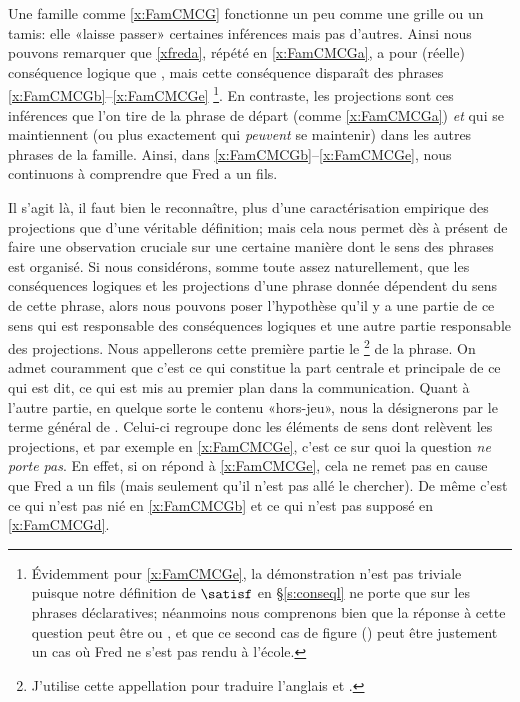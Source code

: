 \begin{refsegment}
Une famille comme \ref{x:FamCMCG} fonctionne un peu comme une grille ou un tamis: elle «laisse passer» certaines inférences mais pas d'autres.
Ainsi nous pouvons remarquer que \ref{xfreda}, répété en \ref{x:FamCMCGa}, a pour (réelle) conséquence logique que , mais cette conséquence disparaît des phrases \ref{x:FamCMCGb}--\ref{x:FamCMCGe}%
\footnote{Évidemment pour \ref{x:FamCMCGe}, la démonstration n'est pas triviale puisque notre définition de $\satisf$ en \S\ref{s:conseql} ne porte que sur les phrases déclaratives; néanmoins nous comprenons bien que la réponse à cette question peut être  ou , et que  ce second cas de figure () peut être justement un cas où Fred ne s'est pas rendu à l'école.}.
En contraste, les projections sont ces inférences que l'on  tire de la phrase de départ (comme  \ref{x:FamCMCGa}) \emph{et} qui se maintiennent (ou plus exactement qui \emph{peuvent} se maintenir)  dans les autres phrases de la famille.
Ainsi, dans \ref{x:FamCMCGb}--\ref{x:FamCMCGe}, nous continuons à comprendre que Fred a un fils.


Il s'agit là, il faut bien le reconnaître,  plus d'une caractérisation empirique des projections que d'une véritable définition; mais cela nous permet dès à présent de faire une observation cruciale sur une certaine manière dont le sens des phrases est organisé.  
Si nous considérons, somme toute assez naturellement, que les conséquences logiques et les projections d'une phrase donnée dépendent du sens de cette phrase, alors nous pouvons poser l'hypothèse qu'il y a une partie de ce sens qui est responsable des conséquences logiques et une autre partie responsable des projections.  
Nous appellerons cette première partie le \footnote{J'utilise cette appellation pour traduire l'anglais  et .} de la phrase.  On admet couramment que c'est ce qui constitue la part centrale et principale de ce qui est dit, ce qui est mis au premier plan dans la communication.  Quant à l'autre partie, en quelque sorte le contenu «hors-jeu», nous la désignerons par le terme général de .  
Celui-ci regroupe donc les éléments de sens dont relèvent les projections, et par exemple en \ref{x:FamCMCGe}, c'est ce sur quoi la question \emph{ne porte pas}. En effet, si on répond  à \ref{x:FamCMCGe}, cela ne remet pas en cause que Fred a un fils (mais seulement qu'il n'est pas allé le chercher).  De même c'est ce qui n'est pas nié en \ref{x:FamCMCGb} et ce qui n'est pas supposé en \ref{x:FamCMCGd}.


\end{refsegment}
